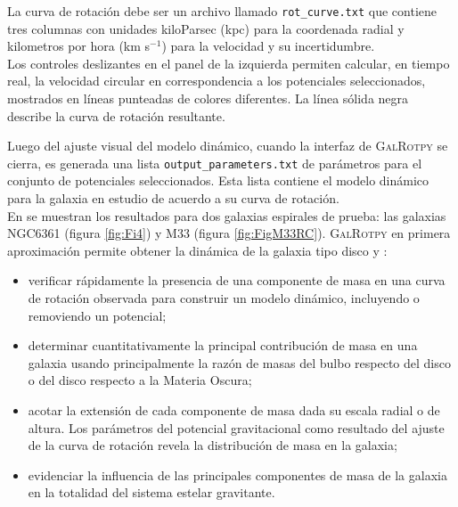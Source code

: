 La curva de rotación debe ser un archivo llamado \verb+rot_curve.txt+ que contiene tres columnas con unidades kiloParsec (kpc) para la coordenada radial y kilometros por hora (km  s$^{-1}$) para la velocidad y su incertidumbre.\\

Los controles deslizantes en el panel de la izquierda permiten calcular, en tiempo real, la velocidad circular en correspondencia a los potenciales seleccionados, mostrados en líneas punteadas de colores diferentes. La línea sólida negra describe la curva de rotación resultante. 

Luego del ajuste visual del modelo dinámico, cuando la interfaz de \textsc{GalRotpy} se cierra, es generada una lista \verb+output_parameters.txt+ de parámetros para el conjunto de potenciales seleccionados. Esta lista contiene el modelo dinámico para la galaxia en estudio de acuerdo a su curva de rotación.\\

En \cite{2017arXiv170501665G} se muestran los resultados para dos galaxias espirales de prueba: las galaxias NGC6361 (figura \ref{fig:Fi4}) y M33 (figura \ref{fig:FigM33RC}). \textsc{GalRotpy} en primera aproximación permite obtener la dinámica de la galaxia tipo disco y :

\begin{itemize}
\item verificar rápidamente la presencia de una componente de masa en una curva de rotación observada para construir un modelo dinámico, incluyendo o removiendo un potencial;
\item determinar cuantitativamente la principal contribución de masa en una galaxia usando principalmente la razón de masas del bulbo respecto del disco o del disco respecto a la Materia Oscura;
\item acotar la extensión de cada componente de masa dada su escala radial o de altura. Los parámetros del potencial gravitacional como resultado del ajuste de la curva de rotación revela la distribución de masa en la galaxia;
\item evidenciar la influencia de las principales componentes de masa de la galaxia en la totalidad del sistema estelar gravitante.
\end{itemize}





